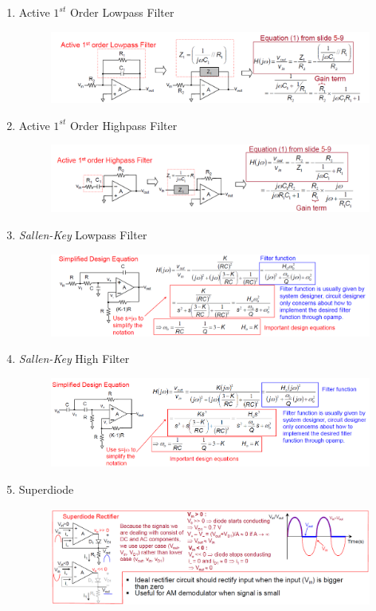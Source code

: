 \begin{enumerate}
\begin{minipage}{0.5\textwidth}
    \end{minipage}
    \item Active $1^{st}$ Order Lowpass Filter
    \begin{figure}[h]
        \centering
        \includegraphics[width=0.75\linewidth]{image/1sactivelowe.png}
    \end{figure}
    \item Active $1^{st}$ Order Highpass Filter
    \begin{figure}[h]
        \centering
        \includegraphics[width=0.78\linewidth]{image/1stactivehigh.png}
    \end{figure}
    \item \textit{Sallen-Key} Lowpass Filter 
    \begin{figure}[h]
        \centering
        \includegraphics[width=0.75\linewidth]{image/ssklowpass.png}
    \end{figure}
    \newpage
    \item \textit{Sallen-Key} High Filter
    \begin{figure}[!h]
        \centering
        \includegraphics[width=0.75\linewidth]{image/skhighpass.png}
    \end{figure}
    \item Superdiode
    \begin{figure}[!h]
        \centering
        \includegraphics[width=0.75\linewidth]{image/superdiode.png}

\end{figure}
\end{enumerate}
